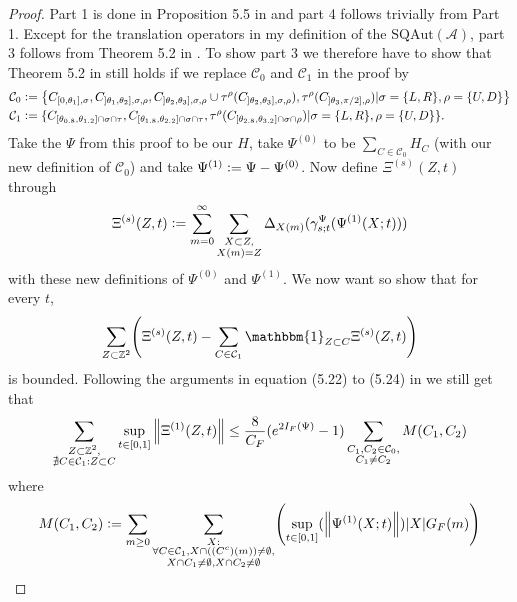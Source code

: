 \documentclass[12pt,a4paper,twoside]{article}
\newcommand{\defeq}{\vcentcolon=}
\let\originalleft\left
\let\originalright\right
\renewcommand{\left}{\mathopen{}\mathclose\bgroup\originalleft}
\renewcommand{\right}{\aftergroup\egroup\originalright}
\newcommand{\ZZ}{\mathbb Z}
\renewcommand{\AA}{\mathcal A}
\newcommand{\id}{\mathbbm{1}}
\theoremstyle{definition}
\numberwithin{equation}{section}
\begin{document}
\begin{proof}
	Part 1 is done in Proposition 5.5 in \cite{ogata2021h3gmathbb} and part 4 follows trivially from Part 1. Except for the translation operators in my definition of the $\textrm{SQAut}(\AA)$, part 3 follows from Theorem 5.2 in \cite{ogata2021h3gmathbb}. To show part 3 we therefore have to show that Theorem 5.2 in \cite{ogata2021h3gmathbb} still holds if we replace $\mathcal{C}_0$ and $\mathcal{C}_1$ in the proof by
	\begin{align}
		\mathcal{C}_0&\defeq \left\{C_{[0,\theta_1],\sigma},C_{]\theta_1,\theta_2],\sigma,\rho},C_{]\theta_2,\theta_3],\sigma,\rho}\cup\tau^{\rho}(C_{]\theta_2,\theta_3],\sigma,\rho}),\tau^\rho(C_{]\theta_3,\pi/2],\rho})|\sigma=\{L,R\},\rho=\{U,D\}\right\}\\
		\mathcal{C}_1&\defeq\{C_{[\theta_{0.8},\theta_{1.2}]\cap\sigma\cap\tau},C_{[\theta_{1.8},\theta_{2.2}]\cap\sigma\cap\tau},\tau^\rho(C_{[\theta_{2.8},\theta_{3.2}]\cap\sigma\cap\rho})|\sigma=\{L,R\},\rho=\{U,D\}\}.
	\end{align}
	Take the $\Psi$ from this proof to be our $H$, take $\Psi^{(0)}$ to be $\sum_{C\in\mathcal{C}_0}H_{C}$ (with our new definition of $\mathcal{C}_0$) and take $\Psi^{(1)}\defeq \Psi-\Psi^{(0)}$. Now define $\Xi^{(s)}(Z,t)$ through
	\begin{equation}\label{eq:PropertiesLocallyGeneratedAutomorphismsProofDefinitionXi}
		\Xi^{(s)}(Z,t)\defeq\sum_{m=0}^\infty \sum_{\substack{X\subset Z,\\X(m)=Z}}\Delta_{X(m)}(\gamma^\Psi_{s;t}(\Psi^{(1)}(X;t)))
	\end{equation}
	with these new definitions of $\Psi^{(0)}$ and $\Psi^{(1)}$. We now want so show that for every $t$,
	\begin{equation}
		\sum_{Z\subset\ZZ^2}\left(\Xi^{(s)}(Z,t)-\sum_{C\in\mathcal{C}_1}\id_{Z\subset C}\Xi^{(s)}(Z,t)\right)
	\end{equation}
	is bounded. Following the arguments in equation (5.22) to (5.24) in \cite{ogata2021h3gmathbb} we still get that
	\begin{equation}
		\sum_{\substack{Z\subset\ZZ^2,\\\nexists C\in\mathcal{C}_1:Z\subset C}}\sup_{t\in[0,1]}\norm{\Xi^{(1)}(Z,t)}\leq \frac{8}{C_F}(e^{2I_F(\Psi)}-1)\sum_{\substack{C_1,C_2\in\mathcal{C}_0,\\ C_1\neq C_2}}M(C_1,C_2)
	\end{equation}
	where
	\begin{equation}
		M(C_1,C_2)\defeq \sum_{m\geq 0}\sum_{\substack{X:\\\forall C\in\mathcal{C}_1,X\cap((C^c)(m))\neq\emptyset,\\X\cap C_1\neq\emptyset,X\cap C_2\neq\emptyset}}\left(\sup_{t\in[0,1]}(\norm{\Psi^{(1)}(X;t)})\abs{X}G_F(m)\right)

\end{equation}
\end{proof}
\end{document}
